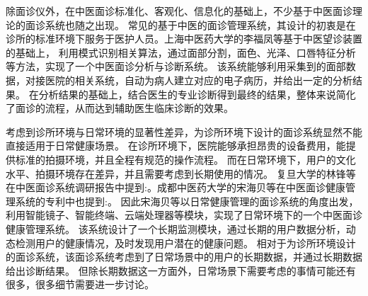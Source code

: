 




除面诊仪外，在中医面诊标准化、客观化、信息化的基础上，不少基于中医面诊理论的面诊系统也随之出现。
常见的基于中医的面诊管理系统，其设计的初衷是在诊所的标准环境下服务于医护人员。上海中医药大学的李福凤等基于中医望诊装置\cite{李国正0一种用于中医望诊的三维图像采集装置}的基础上，
利用模式识别相关算法，通过面部分割，面色、光泽、口唇特征分析等方法，实现了一个中医面诊分析与诊断系统\cite{李福凤2016中医面诊分析与诊断系统}。
该系统能够利用采集到的面部数据，对接医院的相关系统，自动为病人建立对应的电子病历，并给出一定的分析结果。
在分析结果的基础上，结合医生的专业诊断得到最终的结果，整体来说简化了面诊的流程，从而达到辅助医生临床诊断的效果。

考虑到诊所环境与日常环境的显著性差异，为诊所环境下设计的面诊系统显然不能直接适用于日常健康场景。
在诊所环境下，医院能够承担昂贵的设备费用，能提供标准的拍摄环境，并且全程有规范的操作流程。
而在日常环境下，用户的文化水平、拍摄环境存在差异，并且需要考虑到长期使用的情况。
复旦大学的林锋等在中医面诊系统调研报告\cite{林锋2019中医面诊系统调研报告}中提到:。成都中医药大学的宋海贝等在中医面诊健康管理系统的专利\cite{宋海贝2019中医面诊健康管理系统}中也提到:。
因此宋海贝等以日常健康管理的面诊系统的角度出发，利用智能镜子、智能终端、云端处理器等模块，实现了日常环境下的一个中医面诊健康管理系统。
该系统设计了一个长期监测模块，通过长期的用户数据分析，动态检测用户的健康情况，及时发现用户潜在的健康问题。
相对于为诊所环境设计的面诊系统，该面诊系统考虑到了日常场景中的用户的长期数据，并通过长期数据给出诊断结果。
但除长期数据这一方面外，日常场景下需要考虑的事情可能还有很多，很多细节需要进一步讨论。

